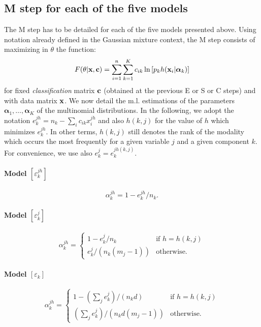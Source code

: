\documentclass[12pt]{article}
\newcommand{\balpha}{\boldsymbol{\alpha}}
\begin{document}
\subsection{M step for each of the five models}
The M step has to be detailed for each of the five models presented above. Using notation
already defined in the Gaussian mixture context, the M step consists of maximizing in $\theta$
the function:
\begin{equation}
  F(\theta| {\bf x}, {\bf
    c})=\sum_{i=1}^{n}\sum_{k=1}^{K} c_{ik} \ln \left [p_{k}  h({\bf
      x}_{i}|\balpha_{k})\right ] \label{eq:Mstep.multi}
\end{equation}
for fixed {\em classification} matrix ${\bf c}$ (obtained at the previous E or S or C steps)
and with data matrix ${\bf x}$. We now detail the m.l. estimations of the parameters
$\balpha_1,\ldots,\balpha_K$ of the multinomial distributions. In the following, we adopt the
notation $e_k^{jh} = n_k - \sum_i c_{ik}x_i^{jh}$ and also $h(k,j)$ for the value of $h$ which
minimizes $e_k^{jh}$. In other terms, $h(k,j)$ still denotes the rank of the modality which
occurs the most frequently for a given variable $j$ and a given component $k$. For convenience,
we use also $e_k^j = e_k^{jh(k,j)}$.

\paragraph{Model $[\varepsilon_k^{jh}]$}
\begin{equation}
  \alpha_k^{jh} = 1 - e_k^{jh} / n_k.
\end{equation}

\paragraph{Model $[\varepsilon_k^j]$}
\begin{equation}
  \alpha_k^{jh} =
  \left\{
    \begin{array}{ll}
      1-e_k^j / n_k & \mbox{if $h=h(k,j)$} \\
      e_k^j / (n_k(m_j-1)) & \mbox{otherwise.}
    \end{array}
  \right.
\end{equation}

\paragraph{Model $[\varepsilon_k]$}
\begin{equation}
  \alpha_k^{jh} =
  \left\{
    \begin{array}{ll}
      1-(\sum_j e_k^j) / (n_k d) & \mbox{if $h=h(k,j)$} \\
      (\sum_j e_k^j) / (n_k d(m_j-1)) & \mbox{otherwise.}
    \end{array}
  \right.
\end{equation}
\end{document}
